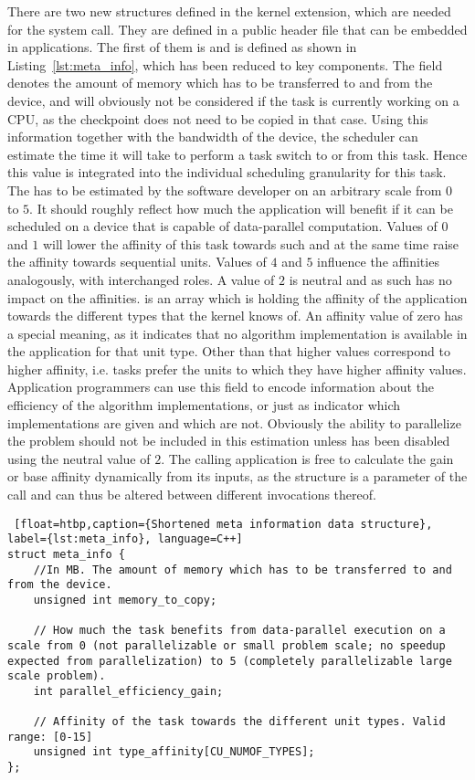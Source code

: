 There are two new structures defined in the kernel extension, which are needed for the  system call. They are defined in a public header file that can be embedded in applications.
The first of them is  and is defined as shown in Listing~\ref{lst:meta_info}, which has been reduced to key components. The field  denotes the amount of memory which has to be transferred to and from the device, and will obviously not be considered if the task is currently working on a CPU, as the checkpoint does not need to be copied in that case. Using this information together with the bandwidth of the device, the scheduler can estimate the time it will take to perform a task switch to or from this task. Hence this value is integrated into the individual scheduling granularity for this task. The  has to be estimated by the software developer on an arbitrary scale from $0$ to $5$. It should roughly reflect how much the application will benefit if it can be scheduled on a device that is capable of data-parallel computation. Values of $0$ and $1$ will lower the affinity of this task towards such \cus{} and at the same time raise the affinity towards sequential units. Values of $4$ and $5$ influence the affinities analogously, with interchanged roles. A value of $2$ is neutral and as such has no impact on the affinities.  is an array which is holding the affinity of the application towards the different \cu{} types that the kernel knows of. An affinity value of zero has a special meaning, as it indicates that no algorithm implementation is available in the application for that unit type. Other than that higher values correspond to higher affinity, i.e. tasks prefer the units to which they have higher affinity values.  Application programmers can use this field to encode information about the efficiency of the algorithm implementations, or just as indicator which implementations are given and which are not. Obviously the ability to parallelize the problem should not be included in this estimation unless  has been disabled using the neutral value of $2$. The calling application is free to calculate the gain or base affinity dynamically from its inputs, as the structure is a parameter of the  call and can thus be altered between different invocations thereof.

\begin{lstlisting} [float=htbp,caption={Shortened meta information data structure}, label={lst:meta_info}, language=C++]
struct meta_info {
	//In MB. The amount of memory which has to be transferred to and from the device.
	unsigned int memory_to_copy;
	
	// How much the task benefits from data-parallel execution on a scale from 0 (not parallelizable or small problem scale; no speedup expected from parallelization) to 5 (completely parallelizable large scale problem).
	int parallel_efficiency_gain;
	
	// Affinity of the task towards the different unit types. Valid range: [0-15]
	unsigned int type_affinity[CU_NUMOF_TYPES];
};
\end{lstlisting}

